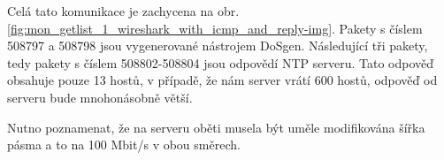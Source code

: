 Celá tato komunikace je zachycena na obr. \ref{fig:mon_getlist_1_wireshark_with_icmp_and_reply-img}. Pakety s číslem 508797 a 508798 jsou vygenerované nástrojem DoSgen. Následující tři pakety, tedy pakety s číslem 508802-508804 jsou odpovědí NTP serveru. Tato odpověď obsahuje pouze 13 hostů, v případě, že nám server vrátí 600 hostů, odpověď od serveru bude mnohonásobně větší.

Nutno poznamenat, že na serveru oběti musela být uměle modifikována šířka pásma a to na 100 Mbit/s v obou směrech.






